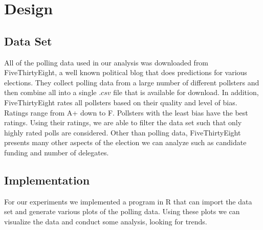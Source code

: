 \section{Design}\label{design}

\subsection{Data Set}

All of the polling data used in our analysis was downloaded from FiveThirtyEight, a well known political blog that does predictions for various elections. They collect polling data from a large number of different pollsters and then combine all into a single $.csv$ file that is available for download. In addition, FiveThirtyEight rates all pollsters based on their quality and level of bias. Ratings range from A+ down to F. Pollsters with the least bias have the best ratings. Using their ratings, we are able to filter the data set such that only highly rated polls are considered. Other than polling data, FiveThirtyEight presents many other aspects of the election we can analyze such as candidate funding and number of delegates.

\subsection{Implementation}

For our experiments we implemented a program in R that can import the data set and generate various plots of the polling data. Using these plots we can visualize the data and conduct some analysis, looking for trends.
